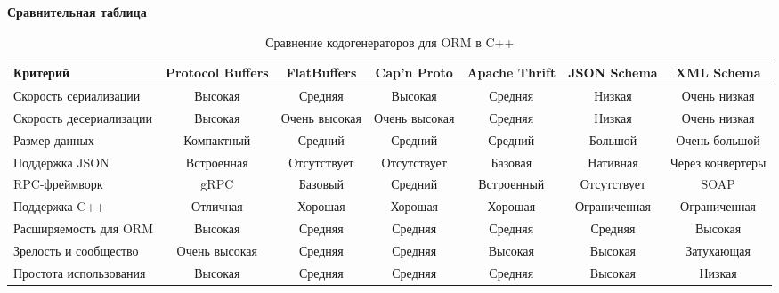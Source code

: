         \textbf{Сравнительная таблица}

            \begin{table}[H]
            \centering
            \scriptsize
            \begin{tabular}{|l|c|c|c|c|c|c|}
            \hline
            \textbf{Критерий} & \textbf{Protocol Buffers} & \textbf{FlatBuffers} & \textbf{Cap'n Proto} & \textbf{Apache Thrift} & \textbf{JSON Schema} & \textbf{XML Schema} \\
            \hline
            Скорость сериализации & Высокая & Средняя & Высокая & Средняя & Низкая & Очень низкая \\
            \hline
            Скорость десериализации & Высокая & Очень высокая & Очень высокая & Средняя & Низкая & Очень низкая \\
            \hline
            Размер данных & Компактный & Средний & Средний & Средний & Большой & Очень большой \\
            \hline
            Поддержка JSON & Встроенная & Отсутствует & Отсутствует & Базовая & Нативная & Через конвертеры \\
            \hline
            RPC-фреймворк & gRPC & Базовый & Средний & Встроенный & Отсутствует & SOAP \\
            \hline
            Поддержка C++ & Отличная & Хорошая & Хорошая & Хорошая & Ограниченная & Ограниченная \\
            \hline
            Расширяемость для ORM & Высокая & Средняя & Средняя & Средняя & Средняя & Высокая \\
            \hline
            Зрелость и сообщество & Очень высокая & Средняя & Средняя & Высокая & Высокая & Затухающая \\
            \hline
            Простота использования & Высокая & Средняя & Средняя & Средняя & Высокая & Низкая \\
            \hline
            \end{tabular}
            \caption{Сравнение кодогенераторов для ORM в C++}
            \end{table}


